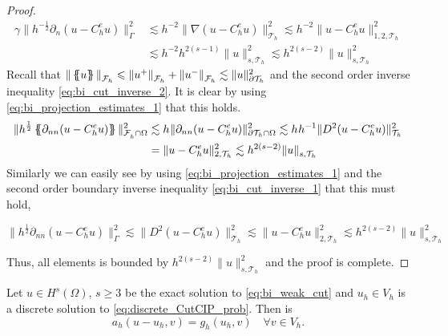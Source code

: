 \begin{proof}
\[        \begin{split}
            \gamma \| h^{-\frac{1}{2}}  \partial _{n} ( u - C_{h}^{e}u ) \|_{ \Gamma    }^{  2} & \lesssim h^{-2} \|   \nabla  ( u - C_{h}^{e}u )    \|_{ \mathcal{T}_{h} }^{2  }  \lesssim  h^{-2} \|    u - C_{h}^{e}u     \|_{1,2, \mathcal{T}_{h}   }^{2  } \\
            & \lesssim h^{-2} h^{2(s-1)}   \| u \|_{s, \mathcal{T}_{h}   }^{  2}  \lesssim  h^{2(s- 2)}   \| u \|_{s, \mathcal{T}_{h}   }^{  2}
        \end{split}
    \]
            Recall that $\| \left\{\!\!\left\{ u \right\}\!\!\right\}   \|_{ \mathcal{F} _{h} }^{  } \leqslant \| u^{+} \|_{ \mathcal{F} _{h}  }^{  } + \| u^{-} \|_{ \mathcal{F} _{h}  }^{  }   \lesssim  \| u \|_{ \partial\mathcal{T }_{h}  }^{2  }  $ and the second order inverse
            inequality \eqref{eq:bi_cut_inverse_2}. It is clear
            by using \eqref{eq:bi_projection_estimates_1} that this holds.
            \[
                \begin{split}
 \| h^{\frac{1}{2}} \left\{\!\!\left\{ \partial _{nn} (u - C_{h}^{e}u) \right\}\!\!\right\}   \|_{\mathcal{F} _{h}^{} \cap \Omega   }^{  2} &  \lesssim h^{} \|   \partial _{nn} (u - C_{h}^{e}u)    \|_{\partial \mathcal{T} _{h} \cap \Omega    }^{  2}  \lesssim h^{} h^{-1}  \|   D^2 (u - C_{h}^{e}u)    \|_{ \mathcal{T} _{h}   }^{  2} \\
                                                                                                                &  = \|   u - C_{h}^{e}u    \|_{ 2, \mathcal{T} _{h}   }^{  2}  \lesssim h^{2(s - 2)}  \| u \|_{s, \mathcal{T} _{h} }^{  }
                \end{split}
            \]
                Similarly we can easily see by using \eqref{eq:bi_projection_estimates_1} and the second order boundary inverse inequality  \eqref{eq:bi_cut_inverse_1} that this must hold,

                \[
              \| h^{\frac{1}{2}} \partial _{nn}(u - C_{h}^{e}u)     \|_{ \Gamma }^{  2} \lesssim   \|  D^2(u - C_{h}^{e}u)     \|_{ \mathcal{T}_{h}   }^{  2} \lesssim \|  u - C_{h}^{e}u \|_{ 2, \mathcal{T}_{h} }^{2  } \lesssim h^{2(s-2)}  \| u \|_{ s, \mathcal{T}_{h}   }^{2  }
            \]

    Thus, all elements is bounded by $ h^{2(s-2)}  \| u \|_{ s, \mathcal{T}_{h}   }^{2  } $  and the proof is complete.
\end{proof}

\begin{lemma}
Let $u \in H^{s}( \Omega )  $, $ s\ge 3 $  be the exact solution to   \eqref{eq:bi_weak_cut} and $u_{h} \in V_{h}$ is a discrete solution to \eqref{eq:discrete_CutCIP_prob}. Then is \[
    a_{h}( u - u_{h}, v) = g_{h} ( u_{h}, v) \quad \forall v \in V_{h}.
    \]
\end{lemma}


